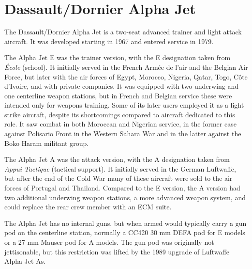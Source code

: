\section{Dassault/Dornier Alpha Jet}

The Dassault/Dornier Alpha Jet is a two-seat advanced trainer and light attack aircraft. It was developed starting in 1967 and entered service in 1979.

The Alpha Jet E was the trainer version, with the E designation taken from \emph{École} (school). It initially served in the French Armée de l’air and the Belgian Air Force, but later with the air forces of Egypt, Morocco, Nigeria, Qatar, Togo, Côte d’Ivoire, and with private companies. It was equipped with two underwing and one centerline weapon stations, but in French and Belgian service these were intended only for weapons training. Some of its later users employed it as a light strike aircraft, despite its shortcomings compared to aircraft dedicated to this role. It saw combat in both Moroccan and Nigerian service, in the former case against Polisario Front in the Western Sahara War and in the latter against the Boko Haram militant group.

The Alpha Jet A was the attack version, with the A designation taken from \emph{Appui Tactique} (tactical support). It initially served in the German Luftwaffe, but after the end of the Cold War many of these aircraft were sold to the air forces of Portugal and Thailand. Compared to the E version, the A version had two additional underwing weapon stations, a more advanced weapon system, and could replace the rear crew member with an ECM suite.

The Alpha Jet has no internal guns, but when armed would typically carry a gun pod on the centerline station, normally a
CC420 30 mm DEFA pod for E models or a 27 mm Mauser pod for A models. The gun pod was originally not jettisonable, but this restriction was lifted by the 1989 upgrade of Luftwaffe Alpha Jet As.

\begin{adclist}
\end{adclist}
